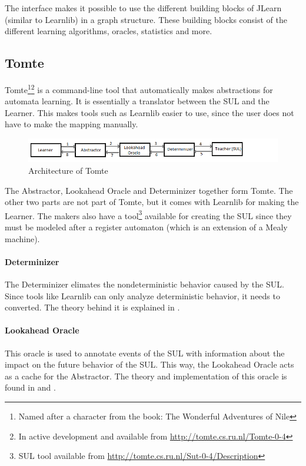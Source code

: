 \documentclass[multi,crop=false,class=article]{standalone}
\begin{document}
The interface makes it possible to use the different building blocks of 
JLearn (similar to Learnlib) in a graph structure. These building blocks 
consist of the different learning algorithms, oracles, statistics and more. 


\subsection{Tomte}
\label{ssec:tomte}

Tomte\footnote{Named after a character from the book: The Wonderful Adventures 
of Nile}\footnote{In active development and available from
\url{http://tomte.cs.ru.nl/Tomte-0-4}} is a command-line tool that 
automatically makes abstractions for automata learning.  It is essentially a 
translator between the SUL and the Learner. This makes 
tools such as Learnlib easier to use, since the user does not have to make the 
mapping manually.

\begin{figure}[!h]
	\includegraphics[width=\textwidth]{Tool_images/tomte_network.png}
	\caption{Architecture of Tomte}
	\label{fig:tomte_arch_interaction}
\end{figure}

The Abstractor, Lookahead Oracle and Determinizer together form Tomte. The
other two parts are not part of Tomte, but it comes with Learnlib for making
the Learner. The makers also have a tool\footnote{SUL tool available from
\url{http://tomte.cs.ru.nl/Sut-0-4/Description}} available for creating the SUL
since they must be modeled after a register automaton\cite{Aarts2015}
(which is an extension of a Mealy machine).

\paragraph{Determinizer} The Determinizer elimates the nondeterministic
behavior caused by the SUL. Since tools like Learnlib can only analyze
deterministic behavior, it needs to converted. The theory behind it is
explained in \cite[p. 172]{Aarts2015}.

\paragraph{Lookahead Oracle} This oracle is used to annotate events of the SUL
with information about the impact on the future behavior of the SUL. This way,
the Lookahead Oracle acts as a cache for the Abstractor. The theory and
implementation of this oracle is found in \cite[p. 170]{Aarts2014} and
\cite[p. 105]{Tomte2014}.
\end{document}

